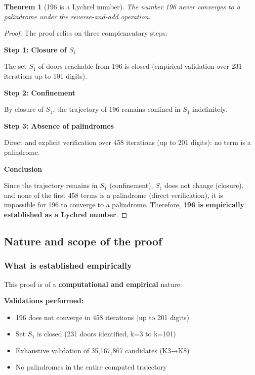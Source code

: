 \documentclass[12pt,a4paper]{article}
\newtheorem{theorem}{Theorem}[section]
\theoremstyle{remark}
\begin{document}
\begin{theorem}[196 is a Lychrel number]
The number 196 never converges to a palindrome under the reverse-and-add operation.
\end{theorem}

\begin{proof}
The proof relies on three complementary steps:

\textbf{Step 1: Closure of $S_1$}

The set $S_1$ of doors reachable from 196 is closed (empirical validation over 231 iterations up to 101 digits).

\textbf{Step 2: Confinement}

By closure of $S_1$, the trajectory of 196 remains confined in $S_1$ indefinitely.

\textbf{Step 3: Absence of palindromes}

Direct and explicit verification over 458 iterations (up to 201 digits): no term is a palindrome.

\textbf{Conclusion}

Since the trajectory remains in $S_1$ (confinement), $S_1$ does not change (closure), and none of the first 458 terms is a palindrome (direct verification), it is impossible for 196 to converge to a palindrome. Therefore, \textbf{196 is empirically established as a Lychrel number}.
\end{proof}

\subsection{Nature and scope of the proof}

\subsubsection{What is established empirically}

This proof is of a \textbf{computational and empirical} nature:

\textbf{Validations performed:}
\begin{itemize}
\item 196 does not converge in 458 iterations (up to 201 digits)
\item Set $S_1$ is closed (231 doors identified, k=3 to k=101)
\item Exhaustive validation of 35,167,867 candidates (K3→K8)
\item No palindromes in the entire computed trajectory
\end{itemize}
\end{document}
